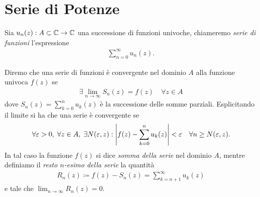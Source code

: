 \section{Serie di Potenze}

\begin{definition}
  Sia $ u_n(z): A \subset \mathbb{C} \to \mathbb{C} $ una successione di funzioni univoche, chiameremo \textit{serie di funzioni} l'espressione
  \begin{align}
    \sum_{n=0}^{\infty} u_n(z).
  \end{align}
\end{definition}
\begin{definition}
  Diremo che una serie di funzioni è convergente nel dominio $ A $ alla funzione univoca $ f(z) $ se 
  \begin{align}
    \exists \lim_{n \to \infty} S_n(z) = f(z) \quad \forall z \in A 
  \end{align}
  dove $ S_n(z) = \sum_{k = 0}^n u_k(z) $ è la successione delle somme parziali. Esplicitando il limite si ha che una serie è convergente se 
  \begin{align}
    \forall \varepsilon > 0, \; \forall z \in A, \; \exists N(\varepsilon, z) : \left| f(z) - \sum_{k = 0}^{n} u_k(z) \right| < \varepsilon \quad \forall n \geq N(\varepsilon, z).
  \end{align}  
  In tal caso la funzione $ f(z) $ si dice \textit{somma della serie} nel 
  dominio $ A $, mentre definiamo il \textit{resto $n$-esimo della serie} la quantità 
  \begin{align}
    R_n(z) \coloneq f(z) - S_n(z) = \sum_{k = n + 1}^\infty u_k(z)
  \end{align}
  e tale che $ \lim_{n\to \infty} R_n(z) = 0 $.
\end{definition}

